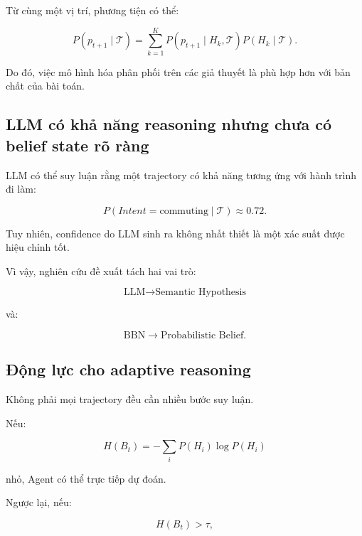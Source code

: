 \documentclass[11pt,a4paper]{article}
\begin{document}
	Từ cùng một vị trí, phương tiện có thể:
	
	\begin{equation}
		P(p_{t+1}\mid\mathcal{T})
		=
		\sum_{k=1}^{K}
		P(p_{t+1}\mid H_k,\mathcal{T})
		P(H_k\mid\mathcal{T}).
	\end{equation}
	
	Do đó, việc mô hình hóa phân phối trên các giả thuyết là phù hợp hơn
	với bản chất của bài toán.
	
	\subsection{LLM có khả năng reasoning nhưng chưa có belief state rõ ràng}
	
	LLM có thể suy luận rằng một trajectory có khả năng tương ứng với hành
	trình đi làm:
	
	\begin{equation}
		P(
		Intent=\text{commuting}
		\mid
		\mathcal{T}
		)
		\approx 0.72.
	\end{equation}
	
	Tuy nhiên, confidence do LLM sinh ra không nhất thiết là một xác suất
	được hiệu chỉnh tốt.
	
	Vì vậy, nghiên cứu đề xuất tách hai vai trò:
	
	\begin{equation}
		\text{LLM}
		\rightarrow
		\text{Semantic Hypothesis}
	\end{equation}
	
	và:
	
	\begin{equation}
		\text{BBN}
		\rightarrow
		\text{Probabilistic Belief}.
	\end{equation}
	
	\subsection{Động lực cho adaptive reasoning}
	
	Không phải mọi trajectory đều cần nhiều bước suy luận.
	
	Nếu:
	
	\begin{equation}
		H(B_t)
		=
		-\sum_i P(H_i)\log P(H_i)
	\end{equation}
	
	nhỏ, Agent có thể trực tiếp dự đoán.
	
	Ngược lại, nếu:
	
	\begin{equation}
		H(B_t)>\tau,
	\end{equation}
	
\end{document}
